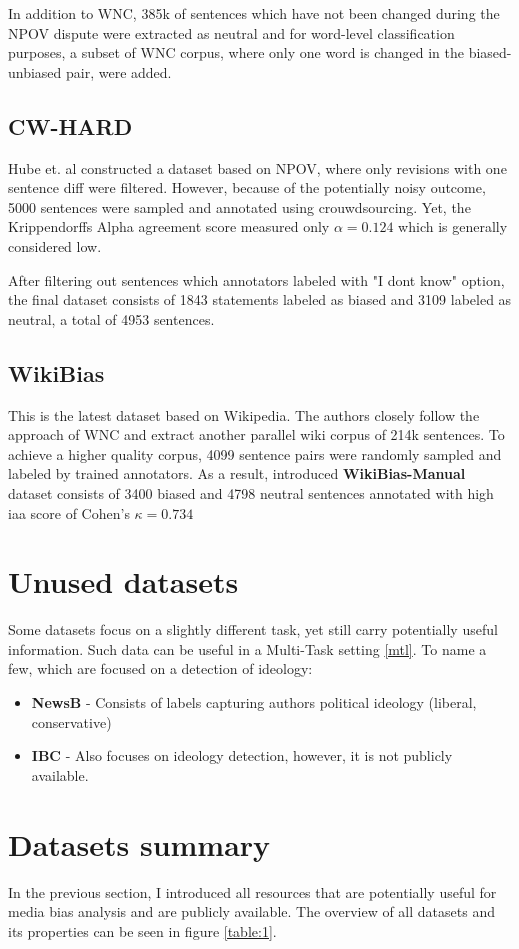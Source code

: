 In addition to WNC, 385k of sentences which have not been changed during the NPOV dispute were extracted as neutral and for word-level classification purposes, a subset of WNC corpus, where only one word is changed in the biased-unbiased pair, were added.




\subsection{CW-HARD}
Hube et. al \cite{hube2019neural} constructed a dataset based on NPOV, where only revisions with one sentence diff were filtered. However, because of the potentially noisy outcome, 5000 sentences were sampled and annotated using crouwdsourcing. Yet, the Krippendorffs Alpha agreement score measured only $\alpha = 0.124$ which is generally considered low. 

After filtering out sentences which annotators labeled with "I dont know" option, the final dataset consists of 1843 statements labeled as biased and 3109 labeled as neutral, a total of 4953 sentences.




\subsection{WikiBias}
This is the latest dataset based on Wikipedia. The authors \cite{zhong-etal-2021-wikibias-detecting} closely follow the approach of WNC \cite{pryzant2020automatically} and extract another parallel wiki corpus of 214k sentences.
To achieve a higher quality corpus, 4099 sentence pairs were randomly sampled and labeled by trained annotators. As a result, introduced \textbf{WikiBias-Manual} dataset consists of 3400 biased and 4798 neutral sentences annotated with high \gls{iaa} score of Cohen's $\kappa = 0.734$





\section{Unused datasets}
 Some datasets focus on a slightly different task, yet still carry potentially useful information. Such data can be useful in a Multi-Task setting \ref{mtl}. To name a few, which are focused on a detection of ideology:
\begin{itemize}
\item \textbf{NewsB} - 
Consists of labels capturing authors political ideology (liberal, conservative)
\item \textbf{IBC} - Also focuses on ideology detection, however, it is not publicly available.
\end{itemize}


\section{Datasets summary}
In the previous section, I introduced all resources that are potentially useful for media bias analysis and are publicly available. The overview of all datasets and its properties can be seen in figure \ref{table:1}.
